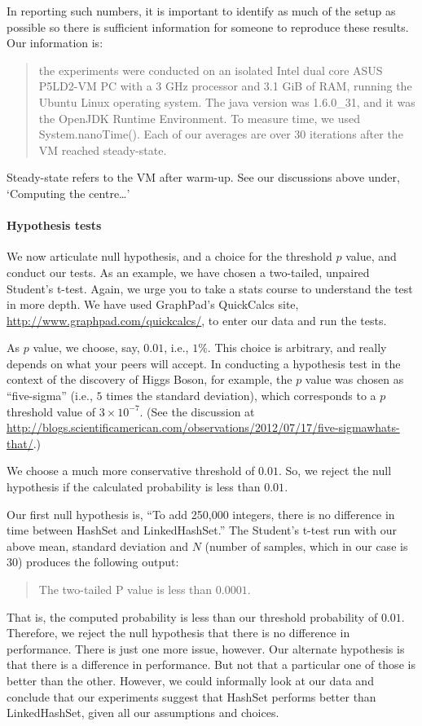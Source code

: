 In reporting such numbers, it is important to identify as much
of the setup as possible so there is sufficient information
for someone to reproduce these results. Our information is:

\begin{quote}
 the experiments were conducted on an isolated Intel dual core
 ASUS P5LD2-VM PC with a 3 GHz processor and 3.1 GiB of RAM,
 running the Ubuntu Linux operating system. The java
 version was 1.6.0\_31, and it was the OpenJDK Runtime Environment.
 To measure time, we used System.nanoTime().
 Each of our averages are over 30 iterations after the VM
 reached steady-state.
 \end{quote}
 Steady-state refers to the VM after 
 warm-up. See our discussions above under,
 `Computing the centre\ldots'

\paragraph{Hypothesis tests} We now articulate null hypothesis,
and a choice for the threshold $p$ value, and conduct our tests.
As an example, we have chosen a two-tailed, unpaired
Student's t-test. Again, we urge you to take a stats course
to understand the test in more depth. We have used 
GraphPad's QuickCalcs site, \url{http://www.graphpad.com/quickcalcs/},
to enter our data and run the tests.

As $p$ value, we choose, say, $0.01$, i.e., $1\%$. This choice
is arbitrary, and really depends on what your peers will accept.
In conducting a hypothesis test in the context of the discovery
of Higgs Boson, for example, the $p$ value was chosen as
``five-sigma'' (i.e., $5$ times the standard deviation), which
corresponds to a $p$ threshold value of $3\times 10^{-7}$.
(See the discussion at \url{http://blogs.scientificamerican.com/observations/2012/07/17/five-sigmawhats-that/}.)

We choose a much more conservative threshold of $0.01$.
So, we reject the null hypothesis if the calculated probability
is less than $0.01$.

Our first null hypothesis is, ``To add 250,000 integers, there
is no difference in time between HashSet and LinkedHashSet.''
The Student's t-test run with our above mean, standard deviation
and $N$ (number of samples, which in our case is $30$) produces
the following output:
\begin{quote}
    The two-tailed P value is less than $0.0001$.
\end{quote}
That is, the computed probability is less than our threshold
probability of $0.01$. Therefore, we reject the null hypothesis
that there is no difference in performance. There is just one
more issue, however. Our alternate hypothesis is that there
is a difference in performance. But not that a particular one
of those is better than the other. However, we could informally
look at our data and conclude that our experiments suggest that
HashSet performs better than LinkedHashSet, given all our
assumptions and choices.

